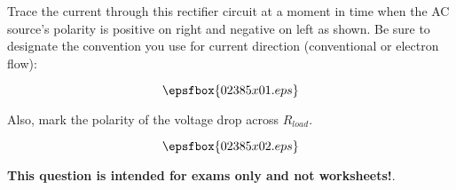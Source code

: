 

Trace the current through this rectifier circuit at a moment in time when the AC source's polarity is positive on right and negative on left as shown.  Be sure to designate the convention you use for current direction (conventional or electron flow):

$$\epsfbox{02385x01.eps}$$

Also, mark the polarity of the voltage drop across $R_{load}$.







$$\epsfbox{02385x02.eps}$$







{\bf This question is intended for exams only and not worksheets!}.




